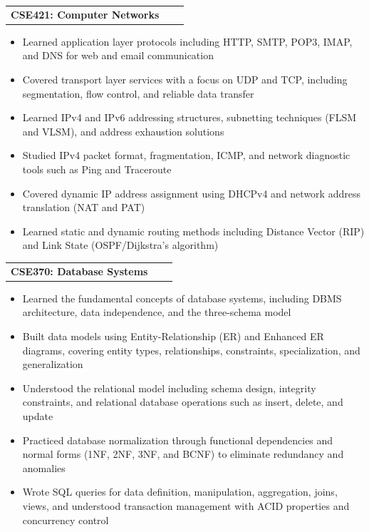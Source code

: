 \documentclass[a4paper,12pt]{article}
\makeatletter
\newenvironment{joblong}[2]
    {
    \begin{tabularx}{\linewidth}{@{}l X r@{}}
    \textbf{#1} & \hfill &  #2 \\[3.75pt]
    \end{tabularx}
    \begin{minipage}[t]{\linewidth}
    \begin{itemize}[nosep,after=\strut, leftmargin=1em, itemsep=3pt,label=--]
    }
    {
    \end{itemize}
    \end{minipage}    
    }
\makeatother
\begin{document}
\begin{joblong}{CSE421: Computer Networks}{}
    \item Learned application layer protocols including HTTP, SMTP, POP3, IMAP, and DNS for web and email communication
    \item Covered transport layer services with a focus on UDP and TCP, including segmentation, flow control, and reliable data transfer
    \item Learned IPv4 and IPv6 addressing structures, subnetting techniques (FLSM and VLSM), and address exhaustion solutions
    \item Studied IPv4 packet format, fragmentation, ICMP, and network diagnostic tools such as Ping and Traceroute
    \item Covered dynamic IP address assignment using DHCPv4 and network address translation (NAT and PAT)
    \item Learned static and dynamic routing methods including Distance Vector (RIP) and Link State (OSPF/Dijkstra's algorithm)
\end{joblong}

\begin{joblong}{CSE370: Database Systems}{}
    \item Learned the fundamental concepts of database systems, including DBMS architecture, data independence, and the three-schema model
    \item Built data models using Entity-Relationship (ER) and Enhanced ER diagrams, covering entity types, relationships, constraints, specialization, and generalization
    \item Understood the relational model including schema design, integrity constraints, and relational database operations such as insert, delete, and update
    \item Practiced database normalization through functional dependencies and normal forms (1NF, 2NF, 3NF, and BCNF) to eliminate redundancy and anomalies
    \item Wrote SQL queries for data definition, manipulation, aggregation, joins, views, and understood transaction management with ACID properties and concurrency control
\end{joblong}
\end{document}
